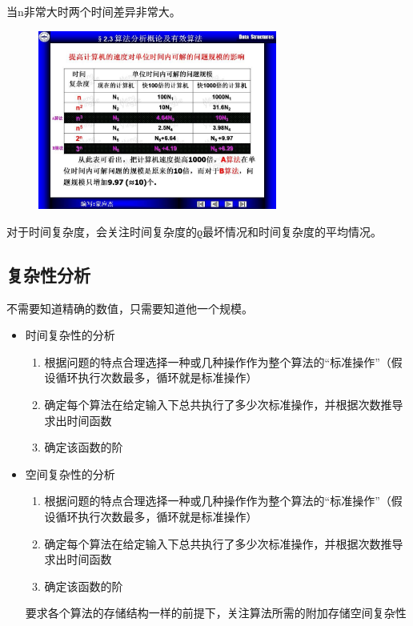 \documentclass[AutoFakeBold]{LZUThesis2007}
\begin{document}
			当n非常大时两个时间差异非常大。

			\begin{figure}[H]
			    \centering
			    \includegraphics[width=0.7\textwidth]{figures/2.3.jpg}
			    
			    \label{fig_install_texlive}
			\end{figure}

			对于时间复杂度，会关注时间复杂度的ϱ最坏情况和时间复杂度的平均情况。

		\subsection{复杂性分析}

			不需要知道精确的数值，只需要知道他一个规模。

			\begin{itemize}
				\item 时间复杂性的分析
					\begin{enumerate}
						\item 根据问题的特点合理选择一种或几种操作作为整个算法的“标准操作”（假设循环执行次数最多，循环就是标准操作）
						\item 确定每个算法在给定输入下总共执行了多少次标准操作，并根据次数推导求出时间函数
						\item 确定该函数的阶
					\end{enumerate}
				\item 空间复杂性的分析
					\begin{enumerate}
						\item 根据问题的特点合理选择一种或几种操作作为整个算法的“标准操作”（假设循环执行次数最多，循环就是标准操作）
						\item 确定每个算法在给定输入下总共执行了多少次标准操作，并根据次数推导求出时间函数
						\item 确定该函数的阶
					\end{enumerate}
				
					要求各个算法的存储结构一样的前提下，关注算法所需的附加存储空间复杂性

			\end{itemize}
\end{document}
